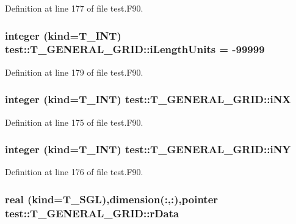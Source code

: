 Definition at line 177 of file test.F90.

\hypertarget{typetest_1_1_t___g_e_n_e_r_a_l___g_r_i_d_ac82de5d9a252574db8745abfa189694f}{
\subsubsection[{iLengthUnits}]{\setlength{\rightskip}{0pt plus 5cm}integer (kind={\bf T\_\-INT}) {\bf test::T\_\-GENERAL\_\-GRID::iLengthUnits} = -\/99999}}
\label{typetest_1_1_t___g_e_n_e_r_a_l___g_r_i_d_ac82de5d9a252574db8745abfa189694f}


Definition at line 179 of file test.F90.

\hypertarget{typetest_1_1_t___g_e_n_e_r_a_l___g_r_i_d_ab2d829428a9d4d65167e08b013867361}{
\subsubsection[{iNX}]{\setlength{\rightskip}{0pt plus 5cm}integer (kind={\bf T\_\-INT}) {\bf test::T\_\-GENERAL\_\-GRID::iNX}}}
\label{typetest_1_1_t___g_e_n_e_r_a_l___g_r_i_d_ab2d829428a9d4d65167e08b013867361}


Definition at line 175 of file test.F90.

\hypertarget{typetest_1_1_t___g_e_n_e_r_a_l___g_r_i_d_ad7c0013f0d2da64df776b4c6638fd11d}{
\subsubsection[{iNY}]{\setlength{\rightskip}{0pt plus 5cm}integer (kind={\bf T\_\-INT}) {\bf test::T\_\-GENERAL\_\-GRID::iNY}}}
\label{typetest_1_1_t___g_e_n_e_r_a_l___g_r_i_d_ad7c0013f0d2da64df776b4c6638fd11d}


Definition at line 176 of file test.F90.

\hypertarget{typetest_1_1_t___g_e_n_e_r_a_l___g_r_i_d_a56e93920405fa6405c8ab5af1e60329e}{
\subsubsection[{rData}]{\setlength{\rightskip}{0pt plus 5cm}real (kind={\bf T\_\-SGL}),dimension(:,:),pointer {\bf test::T\_\-GENERAL\_\-GRID::rData}}}
\label{typetest_1_1_t___g_e_n_e_r_a_l___g_r_i_d_a56e93920405fa6405c8ab5af1e60329e}



